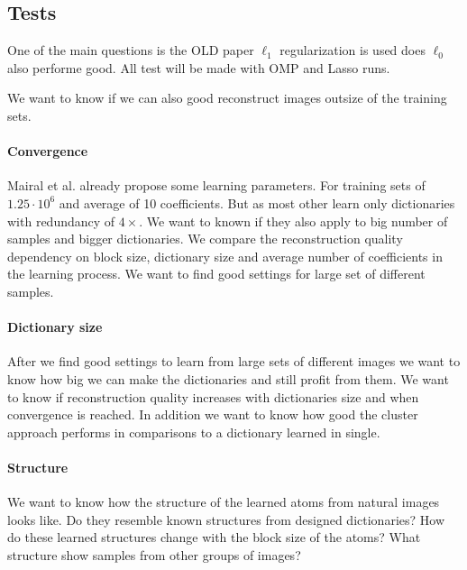 \subsection{Tests}
One of the main questions is the OLD paper $\ell_1$ regularization is used does
$\ell_0$ also performe good.
All test will be made with OMP and Lasso runs.

We want to know if we can also good reconstruct images outsize of the training
sets.




\paragraph{Convergence}
Mairal et al. already propose some learning parameters.
For training sets of $1.25\cdot 10^6$ and average of 10 coefficients.
But as most other learn only dictionaries with redundancy of $4\times$.
We want to known if they also apply to big number of samples and bigger
dictionaries.
We compare the reconstruction quality dependency on block size, dictionary
size and average number of coefficients in the learning process.
We want to find good settings for large set of different samples.

\paragraph{Dictionary size}
After we find good settings to learn from large sets of different images we
want to know how big we can make the dictionaries and still profit from them.
We want to know if reconstruction quality increases with dictionaries
size and when convergence is reached.
In addition we want to know how good the cluster approach performs in
comparisons to a dictionary learned in single.

\paragraph{Structure}
We want to know how the structure of the learned atoms from natural images looks
like. Do they resemble known structures from designed dictionaries? How do these
learned structures change with the block size of the atoms?
What structure show samples from other groups of images?

